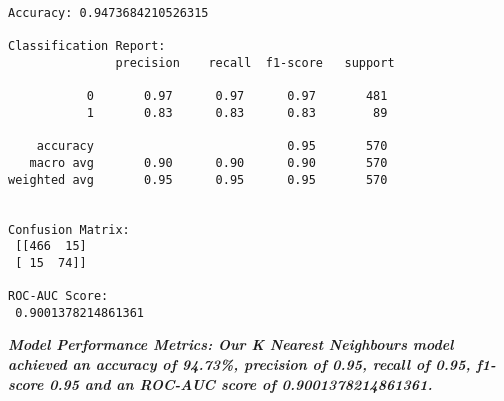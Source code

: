 \documentclass[11pt]{article}
\begin{document}
    \begin{Verbatim}[commandchars=\\\{\}]
Accuracy: 0.9473684210526315

Classification Report:
               precision    recall  f1-score   support

           0       0.97      0.97      0.97       481
           1       0.83      0.83      0.83        89

    accuracy                           0.95       570
   macro avg       0.90      0.90      0.90       570
weighted avg       0.95      0.95      0.95       570


Confusion Matrix:
 [[466  15]
 [ 15  74]]

ROC-AUC Score:
 0.9001378214861361
    \end{Verbatim}

    \textbf{\emph{Model Performance Metrics: Our K Nearest Neighbours model
achieved an accuracy of 94.73\%, precision of 0.95, recall of 0.95,
f1-score 0.95 and an ROC-AUC score of 0.9001378214861361.}}
\end{document}
